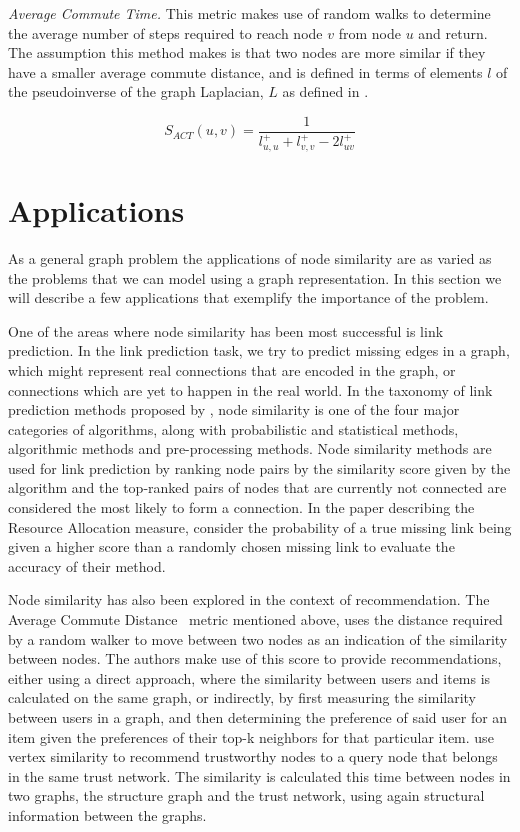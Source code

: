 \emph{Average Commute Time.} This metric makes use of random walks to determine
the average number of steps required to reach node $v$ from node $u$ and return. The assumption
this method makes is that two nodes are more similar if they have a smaller average
commute distance, and is defined in terms of elements $l$ of the pseudoinverse of the
graph Laplacian, $L$ as defined in \cite{link-prediction-survey}.

\begin{equation}
	S_{ACT}(u, v)=\frac{1}{l_{u, u}^{+}+l_{v, v}^{+}-2 l_{uv}^{+}}
\end{equation}


\section{Applications}

As a general graph problem the applications of node similarity are as varied
as the problems that we can model using a graph representation. In this
section we will describe a few applications that exemplify the importance
of the problem.

One of the areas where node similarity has been most successful is link
prediction. In the link prediction task, we try to predict missing
edges in a graph, which might represent real connections that are encoded
in the graph, or connections which are yet to happen in the real world.
In the taxonomy of link prediction methods proposed by
\citet{link-prediction-survey-2017}, node similarity is one of the
four major categories of algorithms, along with probabilistic and
statistical methods, algorithmic methods and pre-processing methods.
Node similarity methods are used for link prediction
by ranking node pairs by the similarity score given by the
algorithm and the top-ranked pairs of nodes that are currently not connected
are considered the most likely to form a connection.
In the paper describing the Resource Allocation measure, \citet{resource-allocation-sim}
consider the probability of a true missing link
being given a higher score than a randomly chosen missing link
to evaluate the accuracy of their method.


Node similarity has also been explored in the context of recommendation.
The Average Commute Distance~\cite{average-commute-distance} metric mentioned above, uses the distance
required by a random walker to move between two nodes as an indication
of the similarity between nodes. The authors make use of this score
to provide recommendations, either using a direct approach, where
the similarity between users and items is calculated on the same
graph, or indirectly, by first measuring the similarity between
users in a graph, and then determining the preference of said
user for an item given the preferences of their top-k neighbors
for that particular item.
\citet{trust-similarity} use vertex similarity to recommend trustworthy
nodes to a query node that belongs in the same trust network.
The similarity is calculated this time between
nodes in two graphs, the structure graph and the trust network,
using again structural information between the graphs.

